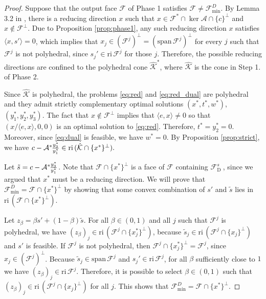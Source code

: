 \documentclass{article}
\newcommand{\reInt}{\mathrm{ri}\,}
\newcommand{\spanVec}{\mathrm{span}\,}
\newcommand{\inProd}[2]{\langle #1 , #2 \rangle }
\newcommand{\feasS}{\mathcal{F}_{\text{D }}^s}
\newcommand{\minFaceD}{ {\mathcal{F}_{\min}^D}}
\newcommand{\stdMap}{ {\mathcal{A}}}
\newcommand{\stdCone}{ {\mathcal{K}}}
\newcommand{\stdFace}{ \mathcal{F}}
\newcommand{\stdInt}{ {e}}
\newcommand{\T}{\ast\hspace{-1pt}}
\begin{document}
\begin{proof}
Suppose that the output face $\stdFace$ of Phase 1 satisfies $\stdFace \neq \minFaceD$. 
By Lemma 3.2 in \cite{article_waki_muramatsu}, there is 
a reducing direction $x$ such that $x \in \stdFace ^* \cap \ker \stdMap \cap \{c\}^\perp$ 
and $x \not \in \stdFace ^\perp$.
Due to Proposition \ref{prop:phase1}, any such reducing direction $x$ satisfies $\inProd{x}{s'} = 0$, which implies that 
 $x_j \in ({\stdFace ^j})^\perp = ({\spanVec \stdFace ^j})^\perp$ for every $j$ such that $\stdFace ^j$ is not polyhedral, 
 since $s_j' \in \reInt \stdFace ^j $ for those $j$.
Therefore, the possible reducing directions are confined to the polyhedral cone $\hat \stdCone^*$,
where $\hat \stdCone$ is the cone in Step 1. of Phase 2.

Since $\hat \stdCone$ is polyhedral, the problems \eqref{eq:red} and \eqref{eq:red_dual} 
 are polyhedral and they admit strictly complementary optimal 
solutions $(x^*,t^*,w^*)$, $(y_1^*,y_2^*,y_3^*)$.
The fact that $x \not \in \stdFace^\perp$ implies that $\inProd{\stdInt}{x}\neq 0$ so that $(x/\inProd{\stdInt}{x},0,0) $ is an optimal 
solution to \eqref{eq:red}. Therefore, $t^* = y_2^* = 0$. Moreover, since \eqref{eq:dual} is 
feasible, we have $w^* = 0$.
By Proposition \ref{prop:strict}, we have 
$c -\stdMap^\T  \frac{y_3^*}{y_1^*} \in \reInt (\hat \stdCone \cap \{x^*\}^\perp).$

Let $\tilde s = c -\stdMap^\T  \frac{y_3^*}{y_1^*}$. Note that $\stdFace \cap \{x^*\}^\perp$ is a face of 
$\stdFace$ containing $\feasS$, since we argued that $x^*$ must be a reducing direction. We will prove that $\minFaceD = \stdFace \cap \{x^*\}^\perp$ by 
 showing that some convex combination of $s'$ and $\tilde s$ lies in $\reInt (\stdFace \cap \{x^*\}^\perp)$. 

Let $z_\beta = \beta s' + (1-\beta)\tilde s$. For 
all $\beta \in (0,1)$ and all $j$ such that $\stdFace ^j$ is polyhedral, we 
have $(z_\beta)_j \in \reInt ( \stdFace ^j  \cap \{x_j^*\}^\perp)$, because $\tilde s _j \in  \reInt (\stdFace ^j  \cap \{x_j\}^\perp)$ and 
$s'$ is feasible.
If $\stdFace ^j$ is not polyhedral, then $\stdFace ^j  \cap \{x_j^*\}^\perp = \stdFace ^j$, 
since $x_j \in (\stdFace ^j)^\perp$. Because $\tilde s _j \in \spanVec{\stdFace ^j}$ and 
$s_j' \in \reInt \stdFace^j$, for all $\beta $ sufficiently close to $1$ we have 
$(z_\beta)_j \in \reInt \stdFace^j$. Therefore, it is possible to select $\beta \in (0,1)$ 
such that $(z_\beta)_j \in \reInt (\stdFace ^j  \cap \{x_j\}^\perp) $ for all $j$. This 
shows that $\minFaceD = \stdFace \cap \{x^*\}^\perp $.


\end{proof}
\end{document}
